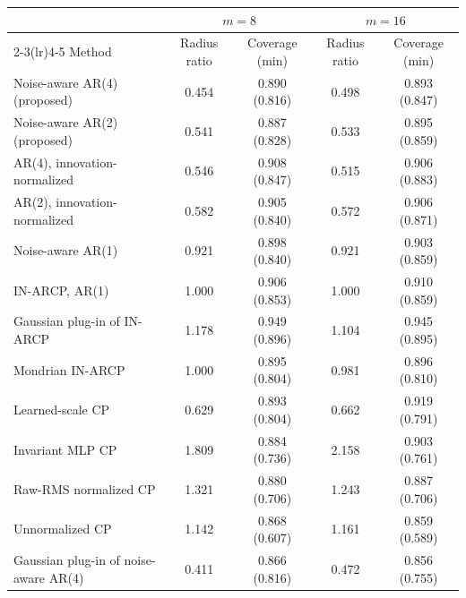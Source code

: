 \begin{tabular}{lcccc}
\toprule
 & \multicolumn{2}{c}{$m=8$} & \multicolumn{2}{c}{$m=16$}\\
\cmidrule(lr){2-3}\cmidrule(lr){4-5}
Method & Radius ratio & Coverage (min) & Radius ratio & Coverage (min)\\
\midrule
Noise-aware AR(4) (proposed) & 0.454 & 0.890 (0.816) & 0.498 & 0.893 (0.847)\\
Noise-aware AR(2) (proposed) & 0.541 & 0.887 (0.828) & 0.533 & 0.895 (0.859)\\
AR(4), innovation-normalized & 0.546 & 0.908 (0.847) & 0.515 & 0.906 (0.883)\\
AR(2), innovation-normalized & 0.582 & 0.905 (0.840) & 0.572 & 0.906 (0.871)\\
Noise-aware AR(1) & 0.921 & 0.898 (0.840) & 0.921 & 0.903 (0.859)\\
IN-ARCP, AR(1) & 1.000 & 0.906 (0.853) & 1.000 & 0.910 (0.859)\\
Gaussian plug-in of IN-ARCP & 1.178 & 0.949 (0.896) & 1.104 & 0.945 (0.895)\\
Mondrian IN-ARCP & 1.000 & 0.895 (0.804) & 0.981 & 0.896 (0.810)\\
Learned-scale CP & 0.629 & 0.893 (0.804) & 0.662 & 0.919 (0.791)\\
Invariant MLP CP & 1.809 & 0.884 (0.736) & 2.158 & 0.903 (0.761)\\
Raw-RMS normalized CP & 1.321 & 0.880 (0.706) & 1.243 & 0.887 (0.706)\\
Unnormalized CP & 1.142 & 0.868 (0.607) & 1.161 & 0.859 (0.589)\\
Gaussian plug-in of noise-aware AR(4) & 0.411 & 0.866 (0.816) & 0.472 & 0.856 (0.755)\\
\bottomrule
\end{tabular}
